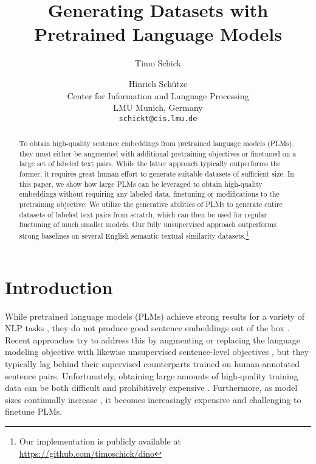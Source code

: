 \documentclass[11pt]{article}
\title{Generating Datasets with Pretrained Language Models}
\author{
	Timo Schick \and Hinrich Sch\"utze \\
	Center for Information and Language Processing \\ LMU Munich, Germany \\
	{\tt schickt@cis.lmu.de}
}
\newcommand\oursLower{dino}
\begin{document}
	\maketitle
	\begin{abstract}
		To obtain high-quality sentence embeddings
	from pretrained language models (PLMs), they must either be
	augmented with additional pretraining objectives or
	finetuned on a large set of labeled text pairs. While the latter approach typically outperforms the former, it requires great human effort to generate suitable datasets of sufficient size.
		In this paper, we show how large PLMs can be leveraged to obtain high-quality embeddings without requiring any labeled data, finetuning or modifications to the
pretraining objective: We utilize the generative abilities
of PLMs to generate entire datasets of labeled text pairs from scratch, which can then be used for regular finetuning of much smaller models. Our fully unsupervised approach outperforms strong  baselines on several English semantic textual similarity datasets.\footnote{Our implementation is publicly available at \url{https://github.com/timoschick/\oursLower}}	\end{abstract}	
\section{Introduction}

While pretrained language models (PLMs) achieve strong results for a variety of NLP tasks
\citep{peters2018deep,radford2018improving,devlin2018bert}, they do not produce good sentence embeddings out of the box \citep{reimers-gurevych-2019-sentence}. Recent approaches try to address this by augmenting or replacing the language modeling objective with likewise unsupervised sentence-level objectives \citep[e.g.,][]{zhang-etal-2020-unsupervised,li-etal-2020-sentence}, but they typically lag behind their supervised counterparts trained on human-annotated sentence pairs. Unfortunately, obtaining large amounts of high-quality training data can be both difficult and prohibitively expensive \citep{bowman-etal-2015-large,agirre-etal-2016-semeval}. Furthermore, as model sizes continually increase \citep{radford2018language,raffel2019exploring,brown2020language,fedus2021switch}, it becomes increasingly expensive and challenging to finetune PLMs.
\end{document}
